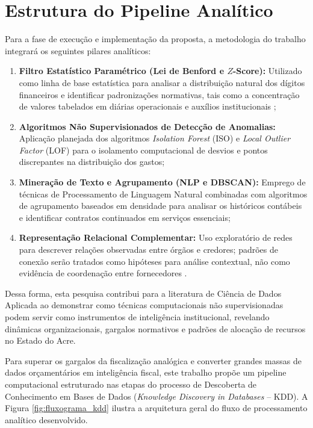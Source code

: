 \documentclass[
    12pt,               %
    openright,          %
    oneside,            %
    a4paper,            %
    chapter=TITLE,      %
    sumario=tradicional,%
    english,            %
    brazilian,          %
 ]{abntex2}
\begin{document}
\section{Estrutura do Pipeline Analítico}\label{sec:estrutura_pipeline}

Para a fase de execução e implementação da proposta, a metodologia do trabalho integrará os seguintes pilares analíticos:\begin{enumerate}
    \item \textbf{Filtro Estatístico Paramétrico (Lei de Benford e $Z$-Score):} Utilizado como linha de base estatística para analisar a distribuição natural dos dígitos financeiros e identificar padronizações normativas, tais como a concentração de valores tabelados em diárias operacionais e auxílios institucionais \cite{cavalcanti2014, nigrini2012};
    \item \textbf{Algoritmos Não Supervisionados de Detecção de Anomalias:} Aplicação planejada dos algoritmos \textit{Isolation Forest} (ISO) \cite{liu2008isolation} e \textit{Local Outlier Factor} (LOF) \cite{breunig2000lof} para o isolamento computacional de desvios e pontos discrepantes na distribuição dos gastos;
    \item \textbf{Mineração de Texto e Agrupamento (NLP e DBSCAN):} Emprego de técnicas de Processamento de Linguagem Natural combinadas com algoritmos de agrupamento baseados em densidade para analisar os históricos contábeis e identificar contratos continuados em serviços essenciais;
    \item \textbf{Representação Relacional Complementar:} Uso exploratório de redes para descrever relações observadas entre órgãos e credores; padrões de conexão serão tratados como hipóteses para análise contextual, não como evidência de coordenação entre fornecedores \cite{nunes2021}.
\end{enumerate}
Dessa forma, esta pesquisa contribui para a literatura de Ciência de Dados Aplicada ao demonstrar como técnicas computacionais não supervisionadas podem servir como instrumentos de inteligência institucional, revelando dinâmicas organizacionais, gargalos normativos e padrões de alocação de recursos no Estado do Acre.

Para superar os gargalos da fiscalização analógica e converter grandes massas de dados orçamentários em inteligência fiscal, este trabalho propõe um pipeline computacional estruturado nas etapas do processo de Descoberta de Conhecimento em Bases de Dados (\textit{Knowledge Discovery in Databases} -- KDD). A Figura \ref{fig:fluxograma_kdd} ilustra a arquitetura geral do fluxo de processamento analítico desenvolvido.
\end{document}
